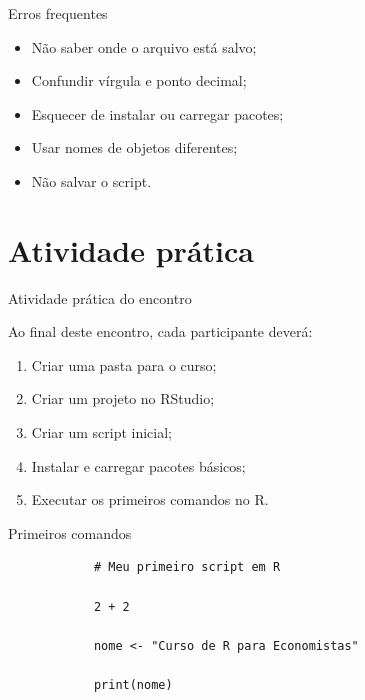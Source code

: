 \documentclass[11pt]{beamer}
\begin{document}
	\begin{frame}{Erros frequentes}
		
		\begin{itemize}
			\item Não saber onde o arquivo está salvo;
			\item Confundir vírgula e ponto decimal;
			\item Esquecer de instalar ou carregar pacotes;
			\item Usar nomes de objetos diferentes;
			\item Não salvar o script.
		\end{itemize}
		
	\end{frame}
	
	\section{Atividade prática}
	
	\begin{frame}{Atividade prática do encontro}
		
		Ao final deste encontro, cada participante deverá:
		
		\begin{enumerate}
			\item Criar uma pasta para o curso;
			\item Criar um projeto no RStudio;
			\item Criar um script inicial;
			\item Instalar e carregar pacotes básicos;
			\item Executar os primeiros comandos no R.
		\end{enumerate}
		
	\end{frame}
	
	\begin{frame}[fragile]{Primeiros comandos}
		
		\begin{verbatim}
			# Meu primeiro script em R
			
			2 + 2
			
			nome <- "Curso de R para Economistas"
			
			print(nome)
		\end{verbatim}
		
	\end{frame}
	
\end{document}
